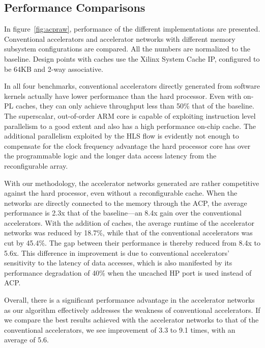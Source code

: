 \documentclass{sig-alternate}
\begin{document}
\subsection{Performance Comparisons}
In figure~\ref{fig:acpraw}, 
performance of the different implementations are presented. 
Conventional accelerators and accelerator networks with different memory subsystem
configurations are compared. All the numbers are normalized to the baseline.
Design points with caches use the Xilinx System Cache IP, configured to be 64KB and 2-way associative.   

In all four benchmarks, conventional accelerators directly generated from software kernels actually have lower performance than the hard processor. Even with
on-PL caches, they can only achieve throughput less than 50\% that of the baseline.
The superscalar, out-of-order ARM core is capable of exploiting instruction level parallelism to a good extent and also has a high performance on-chip cache.
The additional parallelism exploited by the HLS flow is evidently not enough
to compensate for the clock frequency advantage the hard processor core has over the programmable logic and the longer data access latency from the reconfigurable array. 

With our methodology, the accelerator networks generated 
are rather competitive against the hard processor, even
without a reconfigurable cache. When the networks are directly connected to the memory through the ACP, the average performance is 2.3x that of the baseline---an 8.4x gain over the conventional accelerators. 
With the addition of caches,  
the average runtime of the accelerator networks was reduced by 18.7\%,  while that of the conventional accelerators was cut by 45.4\%. The gap between their performance is thereby reduced from 8.4x to 5.6x. This difference in improvement is due to conventional accelerators' sensitivity to the latency of data accesses, which is also manifested by its performance degradation of 40\% when the uncached HP port is used instead of ACP. 

Overall, there is a significant performance advantage in the accelerator networks as our algorithm effectively addresses the weakness of conventional accelerators. If we compare the best results achieved with the
accelerator networks to that of the conventional accelerators, we see improvement
of 3.3 to 9.1 times, with an average of 5.6. 
\end{document}
